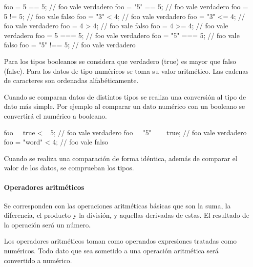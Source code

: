 \begin{myverbatim}
   foo = 5 == 5; // foo vale verdadero
   foo = "5" == 5; // foo vale verdadero
   foo = 5 != 5; // foo vale falso
   foo = "3" < 4; // foo vale verdadero
   foo = "3" <= 4; // foo vale verdadero
   foo = 4 > 4; // foo vale falso
   foo = 4 >= 4; // foo vale verdadero
   foo = 5 === 5; // foo vale verdadero
   foo = "5" === 5; // foo vale falso
   foo = "5" !== 5; // foo vale verdadero
\end{myverbatim} 

Para los tipos booleanos se considera que verdadero (true) es mayor que falso (false). Para los datos de tipo numéricos se toma su valor aritmético.
Las cadenas de caracteres son ordenadas alfabéticamente.

Cuando se comparan datos de distintos tipos se realiza una conversión al tipo de dato más simple. Por ejemplo al comparar un dato numérico con un booleano se convertirá
el numérico a booleano. \\

\begin{myverbatim}
   foo = true <= 5; // foo vale verdadero
   foo = "5" == true; // foo vale verdadero
   foo = "word" < 4; // foo vale falso
\end{myverbatim} 

Cuando se realiza una comparación de forma idéntica, además de comparar el valor de los datos, se comprueban los tipos.



\paragraph{Operadores aritméticos} \label{sec:op_arth}

Se corresponden con las operaciones aritméticas básicas que son la suma, la diferencia, el producto y la división, y 
aquellas derivadas de estas. El resultado de la operación será un número.

Los operadores aritméticos toman como operandos expresiones tratadas como numéricos. Todo dato que sea sometido a una operación
aritmética será convertido a numérico.

